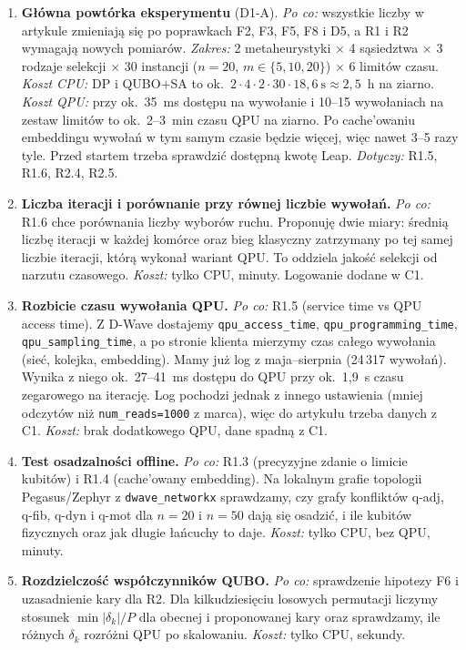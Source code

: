 \documentclass[11pt,a4paper]{article}
\begin{document}
\begin{enumerate}[label=\textbf{C\arabic*.},leftmargin=2.2em]
\item \textbf{Główna powtórka eksperymentu} (D1-A). \emph{Po co:} wszystkie liczby w artykule zmieniają się po poprawkach F2, F3, F5, F8 i D5, a R1 i R2 wymagają nowych pomiarów. \emph{Zakres:} 2 metaheurystyki $\times$ 4 sąsiedztwa $\times$ 3 rodzaje selekcji $\times$ 30 instancji ($n=20$, $m\in\{5,10,20\}$) $\times$ 6 limitów czasu. \emph{Koszt CPU:} DP i QUBO+SA to ok.\ $2\cdot 4\cdot 2\cdot 30\cdot 18{,}6~\text{s} \approx 2{,}5$~h na ziarno. \emph{Koszt QPU:} przy ok.\ 35~ms dostępu na wywołanie i 10--15 wywołaniach na zestaw limitów to ok.\ 2--3~min czasu QPU na ziarno. Po cache'owaniu embeddingu wywołań w tym samym czasie będzie więcej, więc nawet 3--5 razy tyle. Przed startem trzeba sprawdzić dostępną kwotę Leap. \emph{Dotyczy:} R1.5, R1.6, R2.4, R2.5.
\item \textbf{Liczba iteracji i porównanie przy równej liczbie wywołań.} \emph{Po co:} R1.6 chce porównania liczby wyborów ruchu. Proponuję dwie miary: średnią liczbę iteracji w każdej komórce oraz bieg klasyczny zatrzymany po tej samej liczbie iteracji, którą wykonał wariant QPU. To oddziela jakość selekcji od narzutu czasowego. \emph{Koszt:} tylko CPU, minuty. Logowanie dodane w C1.
\item \textbf{Rozbicie czasu wywołania QPU.} \emph{Po co:} R1.5 (service time vs QPU access time). Z D-Wave dostajemy \texttt{qpu\_access\_time}, \texttt{qpu\_programming\_time}, \texttt{qpu\_sampling\_time}, a po stronie klienta mierzymy czas całego wywołania (sieć, kolejka, embedding). Mamy już log z maja--sierpnia (24\,317 wywołań). Wynika z niego ok.\ 27--41~ms dostępu do QPU przy ok.\ 1,9~s czasu zegarowego na iterację. Log pochodzi jednak z innego ustawienia (mniej odczytów niż \texttt{num\_reads=1000} z marca), więc do artykułu trzeba danych z C1. \emph{Koszt:} brak dodatkowego QPU, dane spadną z C1.
\item \textbf{Test osadzalności offline.} \emph{Po co:} R1.3 (precyzyjne zdanie o limicie kubitów) i R1.4 (cache'owany embedding). Na lokalnym grafie topologii Pegasus/Zephyr z \texttt{dwave\_networkx} sprawdzamy, czy grafy konfliktów q-adj, q-fib, q-dyn i q-mot dla $n=20$ i $n=50$ dają się osadzić, i ile kubitów fizycznych oraz jak długie łańcuchy to daje. \emph{Koszt:} tylko CPU, bez QPU, minuty.
\item \textbf{Rozdzielczość współczynników QUBO.} \emph{Po co:} sprawdzenie hipotezy F6 i uzasadnienie kary dla R2. Dla kilkudziesięciu losowych permutacji liczymy stosunek $\min|\delta_k|/P$ dla obecnej i proponowanej kary oraz sprawdzamy, ile różnych $\delta_k$ rozróżni QPU po skalowaniu. \emph{Koszt:} tylko CPU, sekundy.

\end{enumerate}
\end{document}
